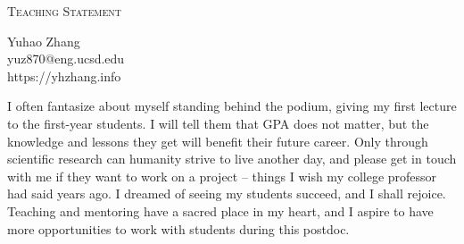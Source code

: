 \documentclass[letterpaper]{article}
\makeatletter
\newcommand{\soptitle}{Teaching Statement}
\newcommand{\yourname}{Yuhao Zhang}
\newcommand{\youremail}{yuz870@eng.ucsd.edu}
\newcommand{\amper}{{\fontspec[Scale=1]{Adobe Caslon Pro}\selectfont\itshape\&~{}}}
\makeatother
\begin{document}
\begin{center}{\huge \scshape \soptitle}\end{center}
\begin{center}\vspace{0.2em} {\Large \yourname\\}
  {\youremail\\} {https://yhzhang.info}\end{center}

\noindent I often fantasize about myself standing behind the podium, giving my first lecture to the first-year students. I will tell them that GPA does not matter, but the knowledge and lessons they get will benefit their future career. Only through scientific research can humanity strive to live another day, and please get in touch with me if they want to work on a project -- things I wish my college professor had said years ago. I dreamed of seeing my students succeed, and I shall rejoice. Teaching and mentoring have a sacred place in my heart, and I aspire to have more opportunities to work with students during this postdoc.
\end{document}
